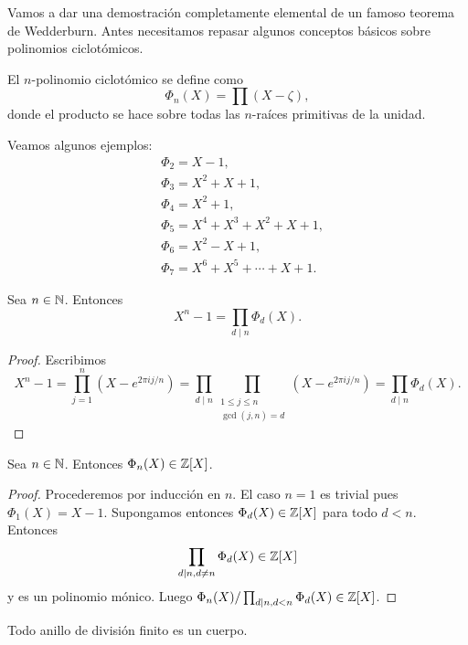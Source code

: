Vamos a dar una demostración completamente elemental de un famoso teorema de
Wedderburn.  Antes necesitamos repasar algunos conceptos básicos sobre
polinomios ciclotómicos.

\begin{definition}
	El $n$-polinomio ciclotómico se define como
	\begin{equation}
		\label{eq:ciclotomico}
		\Phi_n(X)=\prod(X-\zeta),
	\end{equation}
	donde el producto se hace sobre todas las $n$-raíces primitivas de la
	unidad. 
\end{definition}

\begin{example}
	Veamos algunos ejemplos:
	\begin{align*}
		&\Phi_2=X-1,\\
		&\Phi_3=X^2+X+1,\\
		&\Phi_4=X^2+1,\\
		&\Phi_5=X^4+X^3+X^2+X+1,\\
		&\Phi_6=X^2-X+1,\\
		&\Phi_7=X^6+X^5+\cdots+X+1.
	\end{align*}
\end{example}

\begin{lemma}
	Sea $n\in\mathbb{N}$. Entonces 
	\[
		X^n-1=\prod_{d\mid n}\Phi_d(X).
	\]
\end{lemma}

\begin{proof}
	Escribimos
	\[
		X^n-1=\prod_{j=1}^n (X-e^{2\pi ij/n})
		=\prod_{d\mid n}\prod_{\substack{1\leq j\leq n\\\gcd(j,n)=d}}(X-e^{2\pi ij/n})
		=\prod_{d\mid n}\Phi_d(X).
	\]
\end{proof}

\begin{lemma}
	Sea $n\in\mathbb{N}$. Entonces $\Phi_n(X)\in\mathbb{Z}[X]$.
\end{lemma}

\begin{proof}
	Procederemos por inducción en $n$. El caso $n=1$ es trivial pues
	$\Phi_1(X)=X-1$. Supongamos entonces $\Phi_d(X)\in\mathbb{Z}[X]$ para todo $d<n$.
	Entonces 
	\[
		\prod_{d\mid n,d\ne n}\Phi_d(X)\in\mathbb{Z}[X]
	\]
	y es un polinomio mónico. Luego $\Phi_n(X)/\prod_{d\mid
	n,d<n}\Phi_d(X)\in\mathbb{Z}[X]$.
\end{proof}

\begin{theorem}[Wedderburn]
	Todo anillo de división finito es un cuerpo. 
\end{theorem}

